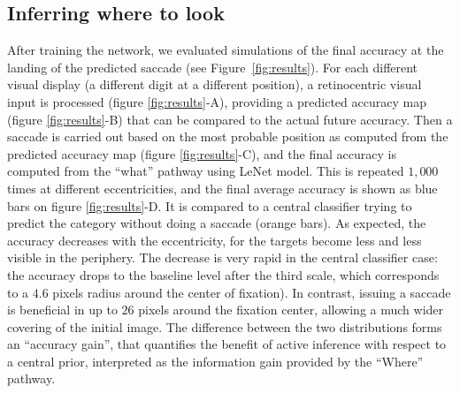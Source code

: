 \subsection{Inferring where to look}
\fi
After training the network, we evaluated simulations of the final accuracy at the landing of the predicted saccade (see Figure~\ref{fig:results}). For each different visual display (a different digit at a different position), a retinocentric visual input is processed (figure \ref{fig:results}-A), providing a predicted accuracy map (figure \ref{fig:results}-B) that can be compared to the actual future accuracy. Then a saccade is carried out based on the most probable position as computed from the predicted accuracy map (figure \ref{fig:results}-C), and the final accuracy is computed from the ``what'' pathway using LeNet model. This is repeated $1,000$ times at different eccentricities, and the final average accuracy is shown as blue bars on figure \ref{fig:results}-D. It is compared to a central classifier trying to predict the category without doing a saccade (orange bars). As expected, the accuracy decreases with the eccentricity, for the targets become less and less visible in the periphery. The decrease is very rapid in the central classifier case: the accuracy drops to the baseline level %
after the third scale, which corresponds to a $4.6$ pixels radius around the center of fixation). In contrast, issuing a saccade is beneficial in up to $26$ pixels around the fixation center, allowing a much wider covering of the initial image. The difference between the two distributions forms an ``accuracy gain'', that quantifies the benefit of active inference with respect to a central prior, interpreted as the information gain provided by the ``Where'' pathway.
\ICANN
\else

